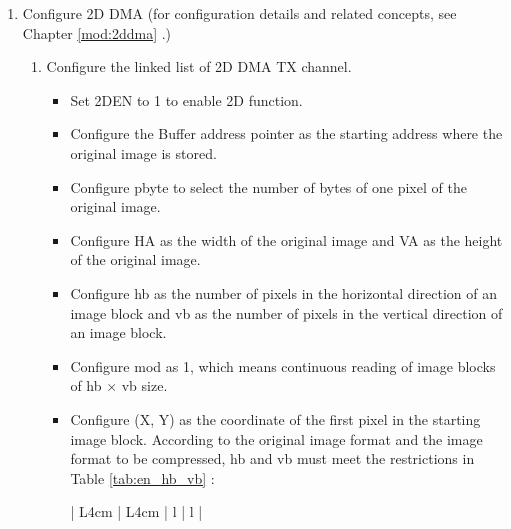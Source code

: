\documentclass[main\_\_EN.tex]{subfiles}
\begin{document}
\begin{enumerate}
\begin{itemize}
\begin{itemize}
                    \item 2: YUV420
                \end{itemize}
        Note that this field is valid only when the original image format is RGB. See Table \ref{tab:csc_result} \textit{}.
        \item Configure \hyperref[fielddesc:JPEGHA]{JPEG\_HA} as the original image width and \hyperref[fielddesc:JPEGVA]{JPEG\_VA} as the original image height.
        \item Configure the quantization coefficient table by following the instructions in Section \ref{sec:jpegcodec-enc-qnr} \textit{}.
        \item Configure timeout detection by following the instructions in Section \ref{sec:jpegcodec-enc-timeout} \textit{}.
    \end{itemize}
    \item Configure 2D DMA (for configuration details and related concepts, see Chapter \ref{mod:2ddma} \textit{}.)
    \begin{enumerate}
        \item Configure the linked list of 2D DMA TX channel.
        \begin{itemize}
            \item Set 2DEN to 1 to enable 2D function.
            \item Configure the Buffer address pointer as the starting address where the original image is stored.
            \item Configure pbyte to select the number of bytes of one pixel of the original image.
            \item Configure HA as the width of the original image and VA as the height of the original image.
            \item Configure hb as the number of pixels in the horizontal direction of an image block and vb as the number of pixels in the vertical direction of an image block.
            \item Configure mod as 1, which means continuous reading of image blocks of hb × vb size.
            \item Configure (X, Y) as the coordinate of the first pixel in the starting image block. According to the original image format and the image format to be compressed, hb and vb must meet the restrictions in Table \ref{tab:en_hb_vb} \textit{}:
        \begin{longtable}{ | L{4cm} | L{4cm} | l | l |}

\end{longtable}
\end{itemize}
\end{enumerate}
\end{enumerate}
\end{document}
